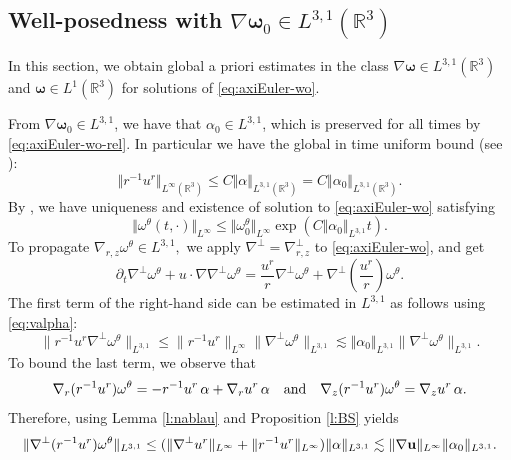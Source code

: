 \documentclass[11pt]{amsart}
\newcommand{\R}{{\mathbb R}}
\numberwithin{equation}{section}
\newcommand{\nrm}[1]{\Vert#1\Vert}
\def\d{\partial}
\newcommand{\nb}{\nabla}
\newcommand{\andf}{\quad\hbox{and}\quad}
\newcommand{\alp}{\alpha}
\newcommand{\tht}{\theta}
\newcommand{\omg}{\omega}
\newcommand{\bfu}{{\bf u}}
\newcommand{\bfomg}{{\boldsymbol{\omega}}}
\begin{document}

	\subsection{Well-posedness with \texorpdfstring{$\nb\bfomg_0 \in L^{3,1}(\R^3)$}{TEXT}} In this section, we obtain global a priori estimates in the class $\nb\bfomg  \in L^{3,1}(\R^3)$ and $\bfomg \in L^{1}(\R^3)$ for solutions of  \eqref{eq:axiEuler-wo}.
	
	
	From $\nb\bfomg_0 \in L^{3,1}$, we have that $ \alpha_0 \in L^{3,1}$, which is preserved for all times by \eqref{eq:axiEuler-wo-rel}. In particular we have the global in time uniform bound  (see \cite{D}):
	\begin{equation}\label{eq:valpha}
					\nrm{r^{-1}u^r}_{L^{\infty}(\R^3)} \le C \nrm{\alpha}_{L^{3,1}(\R^3)}=C \nrm{\alpha_0}_{L^{3,1}(\R^3)}.
		\end{equation} 
		By \cite{D}, we have uniqueness and existence of solution to \eqref{eq:axiEuler-wo} satisfying 
		\begin{equation}\label{eq:omegainfty}
			\nrm{\omg^{\tht}(t,\cdot)}_{L^{\infty}} \le 	\nrm{\omg^{\tht}_0}_{L^{\infty}}  \exp(C\nrm{\alpha_0}_{L^{3,1}} t). 	
		\end{equation} 
	To propagate 
	  $\nb_{r,z} \omg^\tht \in L^{3,1},$  we apply  $\nb^\perp = \nb^\perp_{r,z}$ to  \eqref{eq:axiEuler-wo}, and get
 \begin{equation*}
\d_t \nb^\perp\omg^\tht + u\cdot\nb \nb^\perp\omg^\tht = \frac{u^r}{r} \nb^\perp\omg^\tht + \nb^\perp\left( \frac{u^r}{r} \right)\omg^{\tht}.\end{equation*} 
The first term of the right-hand side can be estimated in $L^{3,1}$ as follows 
	using \eqref{eq:valpha}:
			\begin{equation}
			\|r^{-1}u^r  \nb^\perp\omg^\tht\|_{L^{3,1}}\leq \|r^{-1}u^r\|_{L^\infty}\|\nb^\perp\omg^\tht\|_{L^{3,1}}
			\lesssim  \nrm{\alpha_0}_{L^{3,1}}\|\nb^\perp\omg^\tht\|_{L^{3,1}}.\end{equation}
		To bound the last term, we observe that
		$$\nb_r( r^{-1}u^r )\omg^{\tht}=- r^{-1}u^r\,\alpha+\nb_ru^r \,\alpha\andf
		\nb_z(r^{-1}u^r)\omg^{\tht}=\nb_zu^r\, \alpha.$$
		Therefore, 	using  Lemma \ref{l:nablau} and Proposition \ref{l:BS} yields		
\begin{equation*}			
\| \nb^\perp( r^{-1}u^r )\omg^{\tht}\|_{L^{3,1}}\leq  (\|\nb^\perp u^r\|_{L^{\infty}} + \nrm{r^{-1}u^r}_{L^{\infty}} )\|\alp \|_{L^{3,1}} \lesssim \|\nabla \bfu\|_{L^{\infty}}\|\alp_0 \|_{L^{3,1}} .
\end{equation*}
\end{document}
